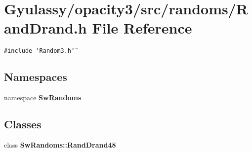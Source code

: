 \section{Gyulassy/opacity3/src/randoms/RandDrand.h File Reference}
\label{RandDrand_8h}
{\tt \#include \char`\"{}Random3.h\char`\"{}}\par
\subsection*{Namespaces}
\begin{CompactItemize}
\item 
namespace {\bf SwRandoms}
\end{CompactItemize}
\subsection*{Classes}
\begin{CompactItemize}
\item 
class {\bf SwRandoms::RandDrand48}
\end{CompactItemize}
